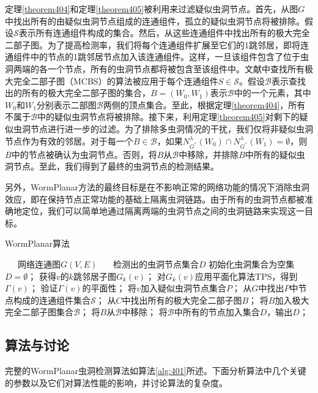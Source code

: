定理\ref{theorem404}和定理\ref{theorem405}被利用来过滤疑似虫洞节点。首先，从图$G$中找出所有的由疑似虫洞节点组成的连通组件，孤立的疑似虫洞节点将被排除。假设$\mathcal{S}$表示所有连通组件构成的集合。然后，从这些连通组件中找出所有的极大完全二部子图。为了提高检测率，我们将每个连通组件扩展至它们的1跳邻居，即将连通组件中的节点的1跳邻居节点加入该连通组件。这样，一旦该组件包含了位于虫洞两端的各一个节点，所有的虫洞节点都将被包含至该组件中。文献中查找所有极大完全二部子图（MCBS）的算法被应用于每个连通组件$S\in{\mathcal{S}}$。假设$\mathcal{B}$表示查找出的所有的极大完全二部子图的集合，$B=(W_0,W_1)$表示$\mathcal{B}$中的一个元素，其中$W_0$和$W_1$分别表示二部图$\mathcal{B}$两侧的顶点集合。至此，根据定理\ref{theorem404}，所有不属于$\mathcal{B}$中的疑似虫洞节点将被排除。接下来，利用定理\ref{theorem405}对剩下的疑似虫洞节点进行进一步的过滤。为了排除多虫洞情况的干扰，我们仅将非疑似虫洞节点作为有效的邻居。对于每一个$B\in{\mathcal{B}}$，如果$N_{G^{''}}^{\lambda}(W_0)\cap{N_{G^{''}}^{\lambda}(W_1)}=\emptyset$，则$B$中的节点被确认为虫洞节点。否则，将$B$从$\mathcal{B}$中移除，并排除$B$中所有的疑似虫洞节点。至此，我们得到了最终的虫洞节点的检测结果。

另外，WormPlanar方法的最终目标是在不影响正常的网络功能的情况下消除虫洞效应，即在保持节点正常功能的基础上隔离虫洞链路。由于所有的虫洞节点都被准确地定位，我们可以简单地通过隔离两端的虫洞节点之间的虫洞链路来实现这一目标。
\begin{algorithm}[t]
\caption{WormPlanar算法}
\label{alg:401}
\begin{algorithmic}[1]
\REQUIRE ~~\
网络连通图$G(V,E)$
\ENSURE ~~\
检测出的虫洞节点集合$D$
\STATE 初始化虫洞集合为空集$D=\emptyset $；
    \STATE 获得$v$的$k$跳邻居子图$G_k(v)$；
    \STATE 对$G_k(v)$应用平面化算法TPS，得到$\Gamma(v)$；
    \STATE 验证$\Gamma(v)$的平面性；
    \IF {$\Gamma(v)$是非平面图}
        \STATE 将$v$加入疑似虫洞节点集合$P$；
    \ENDIF
\ENDFOR
\STATE 从$G$中找出$P$中节点构成的连通组件集合$\mathcal{S}$；
    \STATE 从$C$中找出所有的极大完全二部子图$B$；
    \STATE 将$B$加入极大完全二部子图集合$\mathcal{B}$；
\ENDFOR
{}
        \STATE 将$B$从$\mathcal{B}$中移除；
    \ENDIF
\ENDFOR
\STATE 将$\mathcal{B}$中所有的节点加入集合$D$，输出$D$；
\end{algorithmic}
\end{algorithm}
\subsection{算法与讨论}
完整的WormPlanar虫洞检测算法如算法\ref{alg:401}所述。下面分析算法中几个关键的参数以及它们对算法性能的影响，并讨论算法的复杂度。

